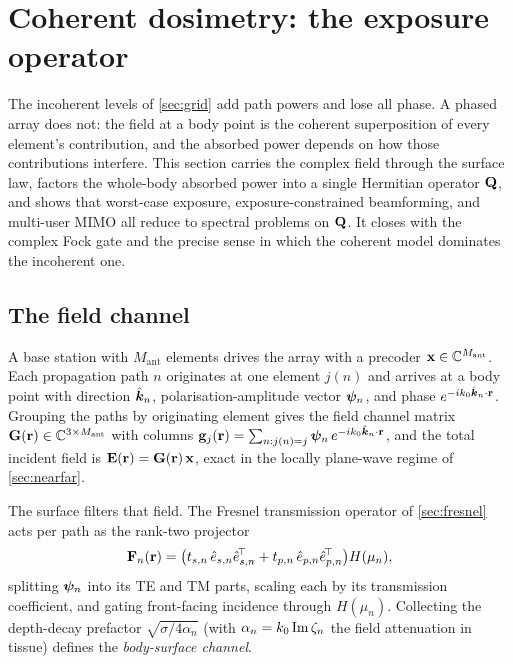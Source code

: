 \section{Coherent dosimetry: the exposure operator}\label{sec:coherent}

The incoherent levels of \cref{sec:grid} add path powers and
lose all phase. A phased array does not: the field at a body point is
the coherent superposition of every element's contribution, and the
absorbed power depends on how those contributions interfere. This
section carries the complex field through the surface law, factors the
whole-body absorbed power into a single Hermitian operator $\mathbf{Q}$, and
shows that worst-case exposure, exposure-constrained beamforming, and
multi-user MIMO all reduce to spectral problems on $\mathbf{Q}$. It closes
with the complex Fock gate and the precise sense in which the coherent
model dominates the incoherent one.

\subsection{The field channel}

A base station with $M_{\mathrm{ant}}$ elements drives the array with a
precoder $\mathbf{x}\in\mathbb{C}^{M_{\mathrm{ant}}}$. Each propagation path $n$
originates at one element $j(n)$ and arrives at a body point with
direction $\hat{\bm{k}}_n$, polarisation-amplitude vector $\bm{\psi}_n$, and
phase $e^{-ik_0\hat{\bm{k}}_n\cdot\mathbf{r}}$. Grouping the paths by originating
element gives the field channel matrix
$\mathbf{G}(\mathbf{r})\in\mathbb{C}^{3\times M_{\mathrm{ant}}}$ with columns
$\mathbf{g}_j(\mathbf{r})=\sum_{n:j(n)=j}\bm{\psi}_n\,e^{-ik_0\hat{\bm{k}}_n\cdot\mathbf{r}}$,
and the total incident field is $\mathbf{E}(\mathbf{r})=\mathbf{G}(\mathbf{r})\,\mathbf{x}$, exact
in the locally plane-wave regime of \cref{sec:nearfar}.

The surface filters that field. The Fresnel transmission operator of
\cref{sec:fresnel} acts per path as the rank-two projector
\begin{equation}\label{eq:Fn}
  \mathbf{F}_n(\mathbf{r})=\bigl(t_{s,n}\,\hat e_{s,n}\hat e_{s,n}^{\!\top}
                        +t_{p,n}\,\hat e_{p,n}\hat e_{p,n}^{\!\top}\bigr)
                    H(\mu_n),
\end{equation}
splitting $\bm{\psi}_n$ into its TE and TM parts, scaling each by its
transmission coefficient, and gating front-facing incidence through
$H(\mu_n)$. Collecting the depth-decay prefactor $\sqrt{\sigma/4\alpha_n}$
(with $\alpha_n=k_0\operatorname{Im}\zeta_n$ the field attenuation in tissue) defines the
\emph{body-surface channel}.

